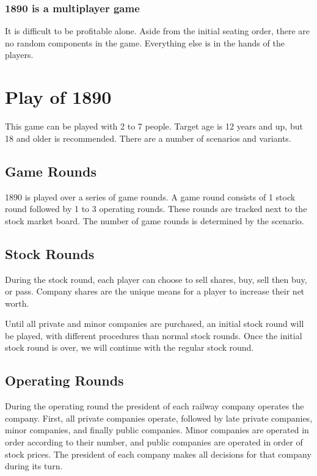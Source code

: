 \documentclass{article}
\begin{document}
\begin{CJK}{UTF8}{min}
\subsubsection*{1890 is a multiplayer game}
It is difficult to be profitable alone. Aside from the initial seating
order, there are no random components in the game. Everything else is
in the hands of the players.

\section{Play of 1890}
This game can be played with 2 to 7 people. Target age is 12 years
and up, but 18 and older is recommended. There are a number of
scenarios and variants.

\subsection{Game Rounds}
1890 is played over a series of game rounds. A game round consists of
1 stock round followed by 1 to 3 operating rounds. These rounds are
tracked next to the stock market board. The number of game rounds is
determined by the scenario.

\subsection{Stock Rounds}


During the stock round, each player can choose to sell
shares, buy, sell then buy, or pass. Company shares are the unique
means for a player to increase their net worth.

Until all private and minor companies are purchased, an initial stock
round will be played, with different procedures than normal stock
rounds. Once the initial stock round is over, we will continue with
the regular stock round.

\subsection{Operating Rounds}
During the operating round the president of each railway company
operates the company. First, all private companies operate, followed
by late private companies, minor companies, and finally public
companies. Minor companies are operated in order according to their
number, and public companies are operated in order of stock
prices. The president of each company makes all decisions for that
company during its turn.


\end{CJK}
\end{document}
